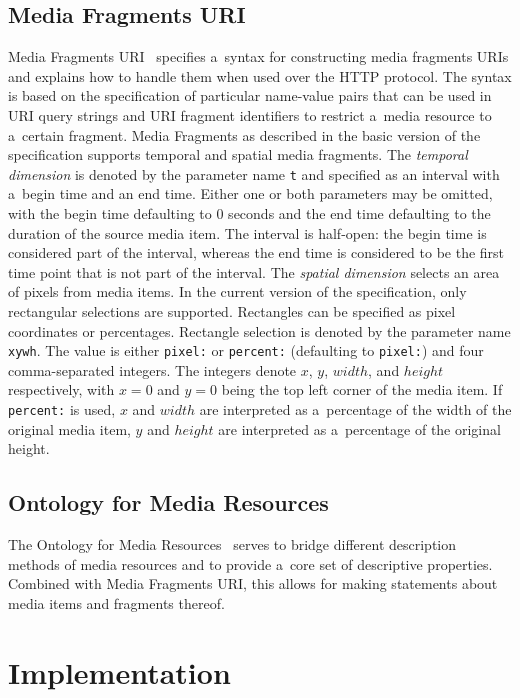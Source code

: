 \documentclass{sig-alternate}
\begin{document}
\subsection{Media Fragments URI}

Media Fragments URI~\cite{troncy2012mediafragments}
specifies a~syntax for constructing media fragments URIs
and explains how to handle them when used over the HTTP protocol.
The syntax is based on the specification of
particular name-value pairs that can be used in URI query strings
and URI fragment identifiers to restrict a~media resource
to a~certain fragment.
Media Fragments as described in the basic version
of the specification supports temporal and spatial media fragments.
The \emph{temporal dimension} is denoted
by the parameter name \texttt{t} and specified as an interval
with a~begin time and an end time.
Either one or both parameters may be omitted,
with the begin time defaulting to 0 seconds
and the end time defaulting to the duration of the source media item.
The interval is half-open: the begin time is considered
part of the interval, whereas the end time is considered
to be the first time point that is not part of the interval.
The \emph{spatial dimension} selects
an area of pixels from media items.
In the current version of the specification,
only rectangular selections are supported.
Rectangles can be specified as pixel coordinates or percentages.
Rectangle selection is denoted by the parameter name \texttt{xywh}.
The value is either \texttt{pixel:} or \texttt{percent:}
(defaulting to \texttt{pixel:}) and four comma-separated integers.
The integers denote $x$, $y$, $width$, and $height$ respectively,
with $x = 0$ and $y = 0$ being the top left corner of the media item.
If \texttt{percent:} is used, $x$ and $width$ are interpreted
as a~percentage of the width of the original media item,
$y$ and $height$ are interpreted as a~percentage
of the original height.

\subsection{Ontology for Media Resources}

The Ontology for Media Resources~\cite{lee2012mediaontology}
serves to bridge different description methods of media resources
and to provide a~core set of descriptive properties.
Combined with Media Fragments URI,
this allows for making statements about media items
and fragments thereof.

\section{Implementation}
\end{document}
